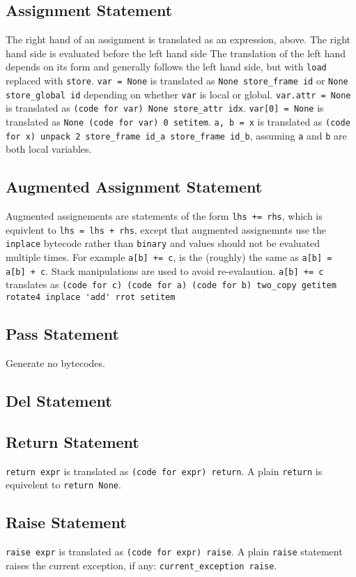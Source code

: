 \documentclass[a4paper,10pt]{article}
\begin{document}
\subsection{Assignment Statement}
The right hand of an assignment is translated as an expression, above.
The right hand side is evaluated before the left hand side
The translation of the left hand depends on its form and generally follows the left hand side, but with \verb|load| replaced with \verb|store|.
\verb|var = None| is translated as \verb|None store_frame id| or \verb|None store_global id| depending on whether \verb|var| is local or global.
\verb|var.attr = None|  is translated as \verb|(code for var) None store_attr idx|.
\verb|var[0] = None|  is translated as \verb|None (code for var) 0 setitem|.
\verb|a, b = x| is translated as \verb|(code for x) unpack 2 store_frame id_a store_frame id_b|,
assuming \verb|a| and \verb|b| are both local variables.

\subsection{Augmented Assignment Statement}
Augmented assignements are statements of the form \verb|lhs += rhs|, which is equivlent to \verb|lhs = lhs + rhs|, except that augmented assignemnts use the \verb|inplace| bytecode rather than \verb|binary| and values should not be evaluated multiple times.
For example \verb|a[b] += c|, is the (roughly) the same as \verb|a[b] = a[b] + c|. Stack manipulations are used to avoid re-evalaution.
\verb|a[b] += c| translates as \verb|(code for c) (code for a) (code for b) two_copy getitem rotate4 inplace 'add' rrot setitem|
\subsection{Pass Statement}
Generate no bytecodes.
\subsection{Del Statement}

\subsection{Return Statement}
\verb|return expr| is translated as \verb|(code for expr) return|. A plain \verb|return| is equivelent to \verb|return None|.

\subsection{Raise Statement}
\verb|raise expr| is translated as \verb|(code for expr) raise|. A plain \verb|raise| statement raises the current exception, if any:
\verb|current_exception raise|.
\end{document}
